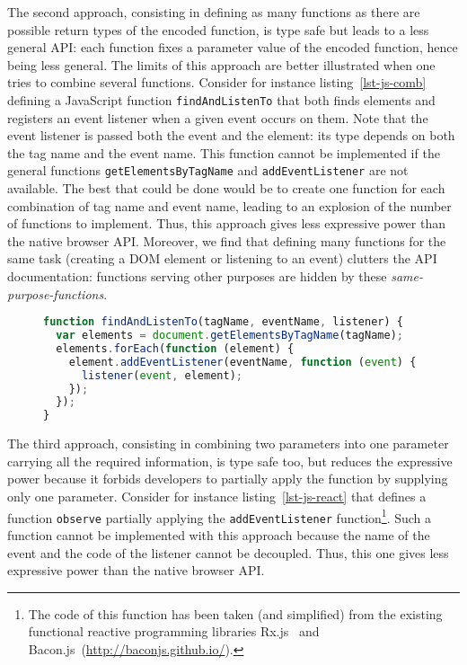 \documentclass{llncs}
\newcommand{\jscode}[1]{\lstinline[language=JavaScript]|#1|}
\begin{document}
The second approach, consisting in defining as many functions as there are possible return types of the encoded function, is type safe but leads to a less general API: each function fixes a parameter value of the encoded function, hence being less general. The limits of this approach are better illustrated when one tries to combine several functions. Consider for instance listing~\ref{lst-js-comb} defining a JavaScript function \jscode{findAndListenTo} that both finds elements and registers an event listener when a given event occurs on them. Note that the event listener is passed both the event and the element: its type depends on both the tag name and the event name. This function cannot be implemented if the general functions \jscode{getElementsByTagName} and \jscode{addEventListener} are not available. The best that could be done would be to create one function for each combination of tag name and event name, leading to an explosion of the number of functions to implement. Thus, this approach gives less 
expressive power than the native browser API. Moreover, we find that defining many functions for the same task (creating a DOM element or listening to an event) clutters the API documentation: functions serving other purposes are hidden by these \emph{same-purpose-functions}.

\begin{figure}
\begin{lstlisting}[label=lst-js-comb,language=JavaScript,caption={Combination of use of \jscode{getElementsByTagName} and \jscode{addEventListener}}]
function findAndListenTo(tagName, eventName, listener) {
  var elements = document.getElementsByTagName(tagName);
  elements.forEach(function (element) {
    element.addEventListener(eventName, function (event) {
      listener(event, element);
    });
  });
}
\end{lstlisting}
\end{figure}

The third approach, consisting in combining two parameters into one parameter carrying all the required information, is type safe too, but reduces the expressive power because it forbids developers to partially apply the function by supplying only one parameter. Consider for instance listing~\ref{lst-js-react} that defines a function \jscode{observe} partially applying the \jscode{addEventListener} function\footnote{The code of this function has been taken (and simplified) from the existing functional reactive programming libraries Rx.js~\cite{liberty2011reactive} and Bacon.js~(\href{http://baconjs.github.io/}{http://baconjs.github.io/}).}. Such a function cannot be implemented with this approach because the name of the event and the code of the listener cannot be decoupled. Thus, this one gives less expressive power than the native browser API.
\end{document}
